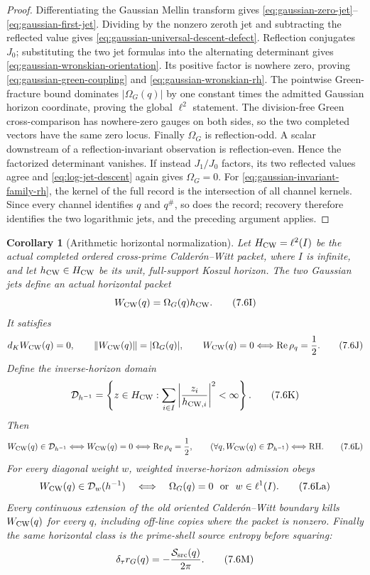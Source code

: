 \documentclass[11pt]{article}
\newtheorem{corollary}[theorem]{Corollary}
\theoremstyle{definition}
\theoremstyle{remark}
\newcommand{\Rea}{\operatorname{Re}}
\begin{document}
\begin{proof}
Differentiating the Gaussian Mellin transform gives
\eqref{eq:gaussian-zero-jet}--\eqref{eq:gaussian-first-jet}.  Dividing by
the nonzero zeroth jet and subtracting the reflected value gives
\eqref{eq:gaussian-universal-descent-defect}.  Reflection
conjugates \(J_0\); substituting the two jet formulas into the alternating
determinant gives \eqref{eq:gaussian-wronskian-orientation}.  Its positive
factor is nowhere zero, proving \eqref{eq:gaussian-green-coupling} and
\eqref{eq:gaussian-wronskian-rh}.  The pointwise Green-fracture bound
dominates \(|\Omega_G(q)|\) by one constant times the admitted Gaussian
horizon coordinate, proving the global \(\ell^2\) statement.  The
division-free Green cross-comparison has nowhere-zero gauges on both sides,
so the two completed vectors have the same zero locus.  Finally
\(\Omega_G\) is reflection-odd.
A scalar downstream of a reflection-invariant observation is
reflection-even.  Hence the factorized determinant vanishes.  If instead
\(J_1/J_0\) factors, its two reflected values agree and
\eqref{eq:log-jet-descent} again gives \(\Omega_G=0\).
For \eqref{eq:gaussian-invariant-family-rh}, the kernel of the full record is
the intersection of all channel kernels.  Since every channel identifies
\(q\) and \(q^\#\), so does the record; recovery therefore identifies the two
logarithmic jets, and the preceding argument applies.
\end{proof}

\begin{corollary}[Arithmetic horizontal normalization]
\label{cor:gaussian-horizontal-normalization}
Let \(H_{\rm CW}=\ell^2(I)\) be the actual completed ordered
cross-prime Calder\'on--Witt packet, where \(I\) is infinite, and let
\(h_{\rm CW}\in H_{\rm CW}\) be its unit, full-support Koszul horizon.  The
two Gaussian jets define an actual horizontal packet
\[
 W_{\rm CW}(q)=\Omega_G(q)h_{\rm CW}.
\tag{7.6I}\label{eq:gaussian-horizontal-packet}
\]
It satisfies
\[
 d_KW_{\rm CW}(q)=0,\qquad
 \|W_{\rm CW}(q)\|=|\Omega_G(q)|,\qquad
 W_{\rm CW}(q)=0\Longleftrightarrow\Rea\rho_q=\frac12.
\tag{7.6J}\label{eq:gaussian-horizontal-packet-law}
\]
Define the inverse-horizon domain
\[
 \mathcal D_{h^{-1}}=
 \left\{z\in H_{\rm CW}:
   \sum_{i\in I}\left|\frac{z_i}{h_{{\rm CW},i}}\right|^2<\infty
 \right\}.
\tag{7.6K}\label{eq:inverse-horizon-domain}
\]
Then
\[
 W_{\rm CW}(q)\in\mathcal D_{h^{-1}}
 \Longleftrightarrow W_{\rm CW}(q)=0
 \Longleftrightarrow\Rea\rho_q=\frac12,
\qquad
 (\forall q, W_{\rm CW}(q)\in\mathcal D_{h^{-1}})
 \Longleftrightarrow\mathrm{RH}.
\tag{7.6L}\label{eq:inverse-horizon-rh}
\]
For every diagonal weight \(w\), weighted inverse-horizon admission obeys
\[
 W_{\rm CW}(q)\in\mathcal D_w(h^{-1})
 \quad\Longleftrightarrow\quad
 \Omega_G(q)=0\ \hbox{ or }\ w\in\ell^1(I).
\tag{7.6La}\label{eq:weighted-horizon-dichotomy}
\]
Every continuous extension of the old oriented Calder\'on--Witt boundary
kills \(W_{\rm CW}(q)\) for every \(q\), including off-line copies where the
packet is nonzero.  Finally the same horizontal class is the prime-shell
source entropy before squaring:
\[
 \delta_\tau r_G(q)=-\frac{\mathcal S_{\rm src}(q)}{2\pi}.
\tag{7.6M}\label{eq:gaussian-defect-source-entropy}
\]
\end{corollary}
\end{document}
